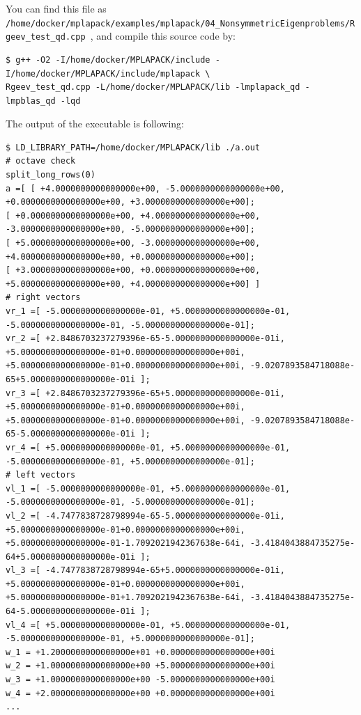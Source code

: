 \documentclass[12pt]{article}
\begin{document}
You can find this file as \\ {\tt /home/docker/mplapack/examples/mplapack/04\_NonsymmetricEigenproblems/Rgeev\_test\_qd.cpp },
and compile this source code by:
\begin{verbatim}
$ g++ -O2 -I/home/docker/MPLAPACK/include -I/home/docker/MPLAPACK/include/mplapack \
Rgeev_test_qd.cpp -L/home/docker/MPLAPACK/lib -lmplapack_qd -lmpblas_qd -lqd
\end{verbatim}
The output of the executable is following:
{\footnotesize
\begin{verbatim}
$ LD_LIBRARY_PATH=/home/docker/MPLAPACK/lib ./a.out
# octave check
split_long_rows(0)
a =[ [ +4.0000000000000000e+00, -5.0000000000000000e+00, +0.0000000000000000e+00, +3.0000000000000000e+00]; 
[ +0.0000000000000000e+00, +4.0000000000000000e+00, -3.0000000000000000e+00, -5.0000000000000000e+00];
[ +5.0000000000000000e+00, -3.0000000000000000e+00, +4.0000000000000000e+00, +0.0000000000000000e+00];
[ +3.0000000000000000e+00, +0.0000000000000000e+00, +5.0000000000000000e+00, +4.0000000000000000e+00] ]
# right vectors
vr_1 =[ -5.0000000000000000e-01, +5.0000000000000000e-01, -5.0000000000000000e-01, -5.0000000000000000e-01];
vr_2 =[ +2.8486703237279396e-65-5.0000000000000000e-01i, +5.0000000000000000e-01+0.0000000000000000e+00i,
+5.0000000000000000e-01+0.0000000000000000e+00i, -9.0207893584718088e-65+5.0000000000000000e-01i ];
vr_3 =[ +2.8486703237279396e-65+5.0000000000000000e-01i, +5.0000000000000000e-01+0.0000000000000000e+00i,
+5.0000000000000000e-01+0.0000000000000000e+00i, -9.0207893584718088e-65-5.0000000000000000e-01i ];
vr_4 =[ +5.0000000000000000e-01, +5.0000000000000000e-01, -5.0000000000000000e-01, +5.0000000000000000e-01];
# left vectors
vl_1 =[ -5.0000000000000000e-01, +5.0000000000000000e-01, -5.0000000000000000e-01, -5.0000000000000000e-01];
vl_2 =[ -4.7477838728798994e-65-5.0000000000000000e-01i, +5.0000000000000000e-01+0.0000000000000000e+00i,
+5.0000000000000000e-01-1.7092021942367638e-64i, -3.4184043884735275e-64+5.0000000000000000e-01i ];
vl_3 =[ -4.7477838728798994e-65+5.0000000000000000e-01i, +5.0000000000000000e-01+0.0000000000000000e+00i,
+5.0000000000000000e-01+1.7092021942367638e-64i, -3.4184043884735275e-64-5.0000000000000000e-01i ];
vl_4 =[ +5.0000000000000000e-01, +5.0000000000000000e-01, -5.0000000000000000e-01, +5.0000000000000000e-01];
w_1 = +1.2000000000000000e+01 +0.0000000000000000e+00i
w_2 = +1.0000000000000000e+00 +5.0000000000000000e+00i
w_3 = +1.0000000000000000e+00 -5.0000000000000000e+00i
w_4 = +2.0000000000000000e+00 +0.0000000000000000e+00i
...
\end{verbatim}
}
\end{document}
